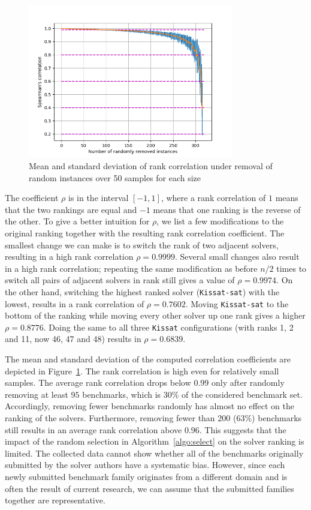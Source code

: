 \documentclass{elsarticle}
\newcommand{\solver}[1]{\texttt{#1}}
\begin{document}
\begin{figure}[t]
  \centering
  \includegraphics[width=0.8\textwidth]{stability/ALL_random_smpling_correlations.png}
  \caption{Mean and standard deviation of rank correlation under removal of random instances over 50 samples for each size}
   \label{fig:sampleAll}
\end{figure}
The coefficient $\rho$ is in the interval $[-1, 1]$, where a rank correlation of
$1$ means that the two rankings are equal and $-1$ means that one ranking is the
reverse of the other. To give a better intuition for $\rho$, we list a few
modifications to the original ranking together with the resulting rank
correlation coefficient. The smallest change we can make is to switch the rank
of two adjacent solvers, resulting in a high rank correlation $\rho = 0.9999$.
Several small changes also result in a high rank correlation; repeating the same
modification as before $n/2$ times to switch all pairs of adjacent solvers in
rank still gives a value of $\rho = 0.9974$. On the other hand, switching the
highest ranked solver (\solver{Kissat-sat}) with the lowest,
results in a rank correlation of $\rho = 0.7602$. Moving \solver{Kissat-sat} to
the bottom of the ranking while moving every other solver up one rank gives a
higher $\rho = 0.8776$. Doing the same to all three \solver{Kissat}
configurations (with ranks 1, 2 and 11, now 46, 47 and 48) results in
$\rho = 0.6839$.

The mean and standard deviation of the computed correlation coefficients are
depicted in Figure~\ref{fig:sampleAll}.
The rank correlation is high even for relatively small samples.
The average rank correlation drops below $0.99$ only after randomly removing at least $95$ benchmarks, which is $30\%$ of the considered benchmark set. Accordingly, removing fewer benchmarks randomly has almost no effect on the ranking of the solvers.
Furthermore, removing fewer than $200$ ($63\%$) benchmarks still results in an average rank correlation above $0.96$.
This suggests that the impact of the random selection in Algorithm~\ref{algo:select} on the solver ranking is limited.
The collected data cannot show whether all of the benchmarks originally
submitted by the solver authors have a systematic bias. However, since each
newly submitted benchmark family originates from a different domain and is often
the result of current research, we can assume that the submitted families
together are representative.
\end{document}
